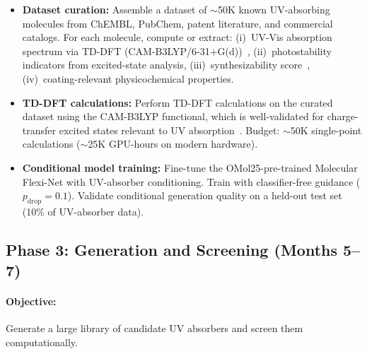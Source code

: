 \documentclass[11pt,a4paper]{article}
\begin{document}
\begin{itemize}[leftmargin=*]
  \item \textbf{Dataset curation:} Assemble a dataset of $\sim$50K known UV-absorbing
    molecules from ChEMBL, PubChem, patent literature, and commercial catalogs.
    For each molecule, compute or extract: (i)~UV-Vis absorption spectrum via
    TD-DFT (CAM-B3LYP/6-31+G(d))~\citep{yanai2004camb3lyp,casida1995tddft},
    (ii)~photostability indicators from excited-state analysis,
    (iii)~synthesizability score~\citep{ertl2009sa},
    (iv)~coating-relevant physicochemical properties.

  \item \textbf{TD-DFT calculations:} Perform TD-DFT calculations on the curated
    dataset using the CAM-B3LYP functional, which is well-validated for
    charge-transfer excited states relevant to UV
    absorption~\citep{yanai2004camb3lyp}. Budget: $\sim$50K single-point
    calculations ($\sim$25K GPU-hours on modern hardware).

  \item \textbf{Conditional model training:} Fine-tune the OMol25-pre-trained
    Molecular Flexi-Net with UV-absorber conditioning. Train with classifier-free
    guidance ($p_\text{drop} = 0.1$). Validate conditional generation quality
    on a held-out test set (10\% of UV-absorber data).
\end{itemize}

\subsection{Phase 3: Generation and Screening (Months 5--7)}

\paragraph{Objective:} Generate a large library of candidate UV absorbers and screen
them computationally.
\end{document}
